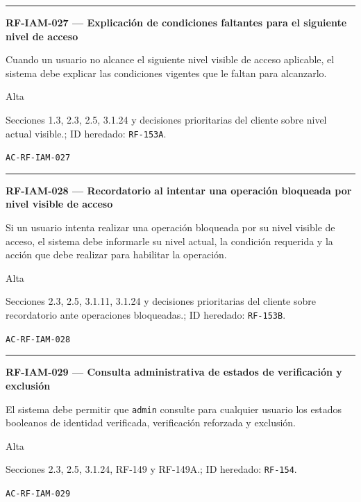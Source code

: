 \documentclass[10pt,letterpaper]{article}
\begin{document}
\vspace{0.25em}\hrule\vspace{0.65em}
\noindent\textbf{RF-IAM-027 --- Explicación de condiciones faltantes para el siguiente nivel de acceso}\par
\begin{description}[style=nextline,leftmargin=3.15cm,labelwidth=2.8cm,font=\normalfont\bfseries]
\item[Obligación] Cuando un usuario no alcance el siguiente nivel visible de acceso aplicable, el sistema debe explicar las condiciones vigentes que le faltan para alcanzarlo.
\item[Prioridad] Alta
\item[Procedencia] Secciones 1.3, 2.3, 2.5, 3.1.24 y decisiones prioritarias del cliente sobre nivel actual visible.; ID heredado: \texttt{RF-153A}.
\item[Verificación] \texttt{AC-RF-IAM-027}
\end{description}
\vspace{0.25em}\hrule\vspace{0.65em}
\noindent\textbf{RF-IAM-028 --- Recordatorio al intentar una operación bloqueada por nivel visible de acceso}\par
\begin{description}[style=nextline,leftmargin=3.15cm,labelwidth=2.8cm,font=\normalfont\bfseries]
\item[Obligación] Si un usuario intenta realizar una operación bloqueada por su nivel visible de acceso, el sistema debe informarle su nivel actual, la condición requerida y la acción que debe realizar para habilitar la operación.
\item[Prioridad] Alta
\item[Procedencia] Secciones 2.3, 2.5, 3.1.11, 3.1.24 y decisiones prioritarias del cliente sobre recordatorio ante operaciones bloqueadas.; ID heredado: \texttt{RF-153B}.
\item[Verificación] \texttt{AC-RF-IAM-028}
\end{description}
\vspace{0.25em}\hrule\vspace{0.65em}
\noindent\textbf{RF-IAM-029 --- Consulta administrativa de estados de verificación y exclusión}\par
\begin{description}[style=nextline,leftmargin=3.15cm,labelwidth=2.8cm,font=\normalfont\bfseries]
\item[Obligación] El sistema debe permitir que \texttt{admin} consulte para cualquier usuario los estados booleanos de identidad verificada, verificación reforzada y exclusión.
\item[Prioridad] Alta
\item[Procedencia] Secciones 2.3, 2.5, 3.1.24, RF-149 y RF-149A.; ID heredado: \texttt{RF-154}.
\item[Verificación] \texttt{AC-RF-IAM-029}
\end{description}
\end{document}
